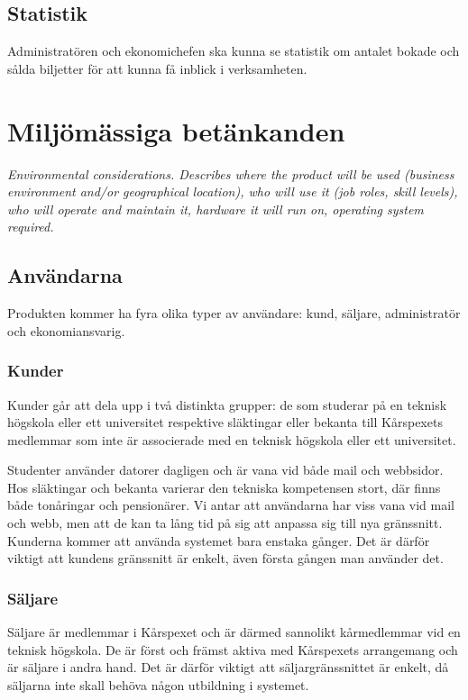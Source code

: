 \documentclass[a4paper, twoside, 11pt, titlepage]{article}
\begin{document}
	\subsection{Statistik}


	Administratören och ekonomichefen ska kunna se statistik om antalet bokade och sålda biljetter för att kunna få inblick i verksamheten.

\clearpage
\section{Miljömässiga betänkanden}


\emph{Environmental considerations. Describes where the product will be used (business environment and/or geographical location), who will use it (job roles, skill levels), who will operate and maintain it, hardware it will run on, operating system required.}

	\subsection{Användarna}


	Produkten kommer ha fyra olika typer av användare: kund, säljare, administratör och ekonomiansvarig.

		\subsubsection{Kunder}


		Kunder går att dela upp i två distinkta grupper: de som studerar på en teknisk högskola eller ett universitet respektive släktingar eller bekanta till Kårspexets medlemmar som inte är associerade med en teknisk högskola eller ett universitet.

		Studenter använder datorer dagligen och är vana vid både mail och webbsidor. Hos släktingar och bekanta varierar den tekniska kompetensen stort, där finns både tonåringar och pensionärer. Vi antar att användarna har viss vana vid mail och webb, men att de kan ta lång tid på sig att anpassa sig till nya gränssnitt. Kunderna kommer att använda systemet bara enstaka gånger. Det är därför viktigt att kundens gränssnitt är enkelt, även första gången man använder det.

		\subsubsection{Säljare}


		Säljare är medlemmar i Kårspexet och är därmed sannolikt kårmedlemmar vid en teknisk högskola. De är först och främst aktiva med Kårspexets arrangemang och är säljare i andra hand. Det är därför viktigt att säljargränssnittet är enkelt, då säljarna inte skall behöva någon utbildning i systemet.
\end{document}
